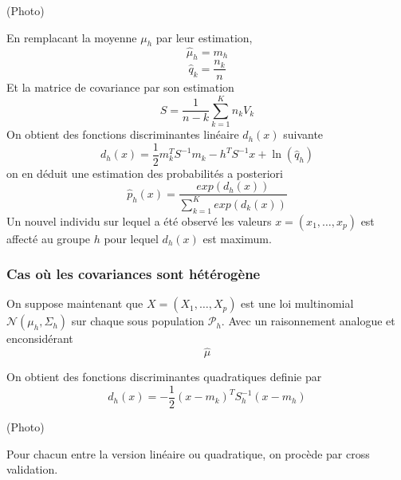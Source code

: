 \documentclass{article}
\begin{document}
(Photo)

En remplacant la moyenne $\mu_h$ par leur estimation,
\begin{equation}
\hat{\mu}_h=m_h
\end{equation}
\begin{equation}
\hat{q}_k=\frac{n_k}{n}
\end{equation}
Et la matrice de covariance par son estimation
\begin{equation}
S=\frac{1}{n-k}\sum_{k=1}^Kn_kV_k
\end{equation}
On obtient des fonctions discriminantes lin\'eaire $d_h(x)$ suivante
\begin{equation}
d_h(x)=\frac{1}{2}m_k^TS^{-1}m_k-h^TS^{-1}x+\ln(\hat{q}_h)
\end{equation}
on en d\'eduit une estimation des probabilit\'es a posteriori
\begin{equation}
\hat{p}_h(x)=\frac{exp(d_h(x))}{\sum_{k=1}^K exp(d_k(x))}
\end{equation}
Un nouvel individu sur lequel a \'et\'e observ\'e les valeurs $x=(x_1,\ldots,x_p)$ est affect\'e au groupe $h$ pour lequel $d_h(x)$ est maximum.

\subsubsection{Cas o\`u les covariances sont h\'et\'erog\`ene}
On suppose maintenant que $X=(X_1,\ldots,X_p)$ est une loi multinomial $\mathcal{N}(\mu_h,\Sigma_h)$ sur chaque sous population $\mathcal{P}_h$.
Avec un raisonnement analogue et enconsid\'erant
\begin{equation}
\hat{\mu}
\end{equation}

On obtient des fonctions discriminantes quadratiques definie par 
\begin{equation}
d_h(x)=-\frac{1}{2}(x-m_k)^TS_h^{-1}(x-m_h)
\end{equation}

(Photo)

Pour chacun entre la version lin\'eaire ou quadratique, on proc\`ede par cross validation.
\end{document}
